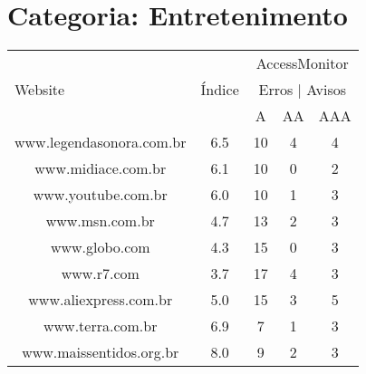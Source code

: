 \section{Categoria: Entretenimento}
\label{sec:apendiceentretenimento}
\begin{center}
\begin{longtable}{|l|l|l|l|l|}
\hline
\multirow{3}{277pt}{\centerline{Website}} & 
\multirow{3}{30pt}{\centerline{Índice}} & \multicolumn{3}{c|}{AccessMonitor} \\ 
\cline{3-5}
\multicolumn{1}{|c|}{} & \multicolumn{1}{c|}{} & \multicolumn{3}{c|}{Erros | Avisos} \\ 
\cline{3-5}
\multicolumn{1}{|c|}{} & \multicolumn{1}{c|}{} & \multicolumn{1}{c|}{A} & \multicolumn{1}{c|}{AA} & \multicolumn{1}{c|}{AAA} \\ 
\hline
\multicolumn{1}{|c|}{www.legendasonora.com.br} & \multicolumn{1}{c|}{6.5} & \multicolumn{1}{c|}{10} & \multicolumn{1}{c|}{4} & \multicolumn{1}{c|}{4} \\ 
\hline
\multicolumn{1}{|c|}{www.midiace.com.br} & \multicolumn{1}{c|}{6.1} & \multicolumn{1}{c|}{10} & \multicolumn{1}{c|}{0} & \multicolumn{1}{c|}{2} \\ 
\hline
\multicolumn{1}{|c|}{www.youtube.com.br} & \multicolumn{1}{c|}{6.0} & \multicolumn{1}{c|}{10} & \multicolumn{1}{c|}{1} & \multicolumn{1}{c|}{3} \\ 
\hline
\multicolumn{1}{|c|}{www.msn.com.br} & \multicolumn{1}{c|}{4.7} & \multicolumn{1}{c|}{13} & \multicolumn{1}{c|}{2} & \multicolumn{1}{c|}{3} \\ 
\hline
\multicolumn{1}{|c|}{www.globo.com} & \multicolumn{1}{c|}{4.3} & \multicolumn{1}{c|}{15} & \multicolumn{1}{c|}{0} & \multicolumn{1}{c|}{3} \\ 
\hline
\multicolumn{1}{|c|}{www.r7.com} & \multicolumn{1}{c|}{3.7} & \multicolumn{1}{c|}{17} & \multicolumn{1}{c|}{4} & \multicolumn{1}{c|}{3} \\ 
\hline
\multicolumn{1}{|c|}{www.aliexpress.com.br} & \multicolumn{1}{c|}{5.0} & \multicolumn{1}{c|}{15} & \multicolumn{1}{c|}{3} & \multicolumn{1}{c|}{5} \\ 
\hline
\multicolumn{1}{|c|}{www.terra.com.br} & \multicolumn{1}{c|}{6.9} & \multicolumn{1}{c|}{7} & \multicolumn{1}{c|}{1} & \multicolumn{1}{c|}{3} \\ 
\hline
\multicolumn{1}{|c|}{www.maissentidos.org.br} & \multicolumn{1}{c|}{8.0} & \multicolumn{1}{c|}{9} & \multicolumn{1}{c|}{2} & \multicolumn{1}{c|}{3} \\ 

\end{longtable}
\end{center}
